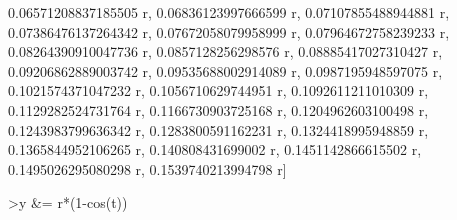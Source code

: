 \documentclass[12pt,arial,letterpaper]{book}
\begin{document}
\begin{eulercomment}
\begin{eulercomment}
\begin{eulercomment}
\begin{eulercomment}
\begin{eulercomment}
\begin{eulercomment}
\begin{eulercomment}
\begin{eulercomment}
\begin{eulercomment}
\begin{eulercomment}
\begin{eulercomment}
\begin{eulercomment}
\begin{eulercomment}
\begin{eulercomment}
\begin{eulercomment}
\begin{eulercomment}
\begin{eulercomment}
\begin{eulercomment}
\begin{eulercomment}
\begin{eulercomment}
\begin{eulercomment}
\begin{eulercomment}
\begin{euleroutput}
  0.06571208837185505 r, 0.06836123997666599 r, 0.07107855488944881 r, 
  0.07386476137264342 r, 0.07672058079958999 r, 0.07964672758239233 r, 
  0.08264390910047736 r, 0.0857128256298576 r, 0.08885417027310427 r, 
  0.09206862889003742 r, 0.09535688002914089 r, 0.0987195948597075 r, 
  0.1021574371047232 r, 0.1056710629744951 r, 0.1092611211010309 r, 
  0.1129282524731764 r, 0.1166730903725168 r, 0.1204962603100498 r, 
  0.1243983799636342 r, 0.1283800591162231 r, 0.1324418995948859 r, 
  0.1365844952106265 r, 0.140808431699002 r, 0.1451142866615502 r, 
  0.1495026295080298 r, 0.1539740213994798 r]
  
\end{euleroutput}
\begin{eulerprompt}
>y &= r*(1-cos(t))
\end{eulerprompt}
\begin{euleroutput}
  

\end{euleroutput}
\end{eulercomment}
\end{eulercomment}
\end{eulercomment}
\end{eulercomment}
\end{eulercomment}
\end{eulercomment}
\end{eulercomment}
\end{eulercomment}
\end{eulercomment}
\end{eulercomment}
\end{eulercomment}
\end{eulercomment}
\end{eulercomment}
\end{eulercomment}
\end{eulercomment}
\end{eulercomment}
\end{eulercomment}
\end{eulercomment}
\end{eulercomment}
\end{eulercomment}
\end{eulercomment}
\end{eulercomment}
\end{document}
